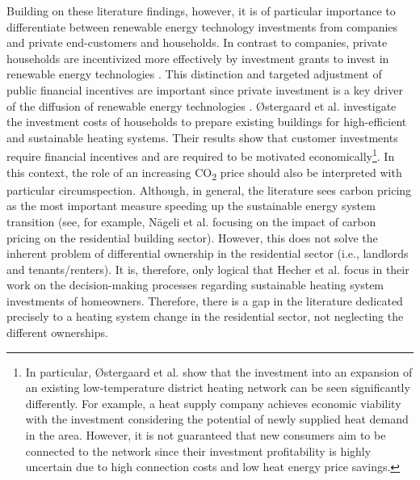 Building on these literature findings, however, it is of particular importance to differentiate between renewable energy technology investments from companies and private end-customers and households. In contrast to companies, private households are incentivized more effectively by investment grants to invest in renewable energy technologies \cite{roth2020impact}. This distinction and targeted adjustment of public financial incentives are important since private investment is a key driver of the diffusion of renewable energy technologies \cite{wustenhagen2012strategic}. {\O}stergaard et al. \cite{ostergaard2019costs} investigate the investment costs of households to prepare existing buildings for high-efficient and sustainable heating systems. Their results show that customer investments require financial incentives and are required to be motivated economically\footnote{In particular, {\O}stergaard et al. \cite{ostergaard2019costs} show that the investment into an expansion of an existing low-temperature district heating network can be seen significantly differently. For example, a heat supply company achieves economic viability with the investment considering the potential of newly supplied heat demand in the area. However, it is not guaranteed that new consumers aim to be connected to the network since their investment profitability is highly uncertain due to high connection costs and low heat energy price savings.}. In this context, the role of an increasing CO\textsubscript{2} price should also be interpreted with particular circumspection. Although, in general, the literature sees carbon pricing as the most important measure speeding up the sustainable energy system transition (see, for example, Nägeli et al. \cite{nageli2020policies} focusing on the impact of carbon pricing on the residential building sector). However, this does not solve the inherent problem of differential ownership in the residential sector (i.e., landlords and tenants/renters). It is, therefore, only logical that Hecher et al. \cite{hecher2017trigger} focus in their work on the decision-making processes regarding sustainable heating system investments of homeowners. Therefore, there is a gap in the literature dedicated precisely to a heating system change in the residential sector, not neglecting the different ownerships.\vspace{0.5cm} 

